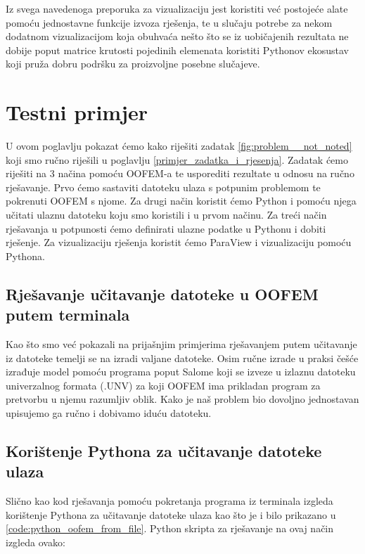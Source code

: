 \documentclass[a4paper,twoside,12pt]{memoir} %
\begin{document}
Iz svega navedenoga preporuka za vizualizaciju jest koristiti već postojeće alate pomoću jednostavne funkcije izvoza rješenja, te u slučaju potrebe za nekom dodatnom vizualizacijom koja obuhvaća nešto što se iz uobičajenih rezultata ne dobije poput matrice krutosti pojedinih elemenata koristiti Pythonov ekosustav koji pruža dobru podršku za proizvoljne posebne slučajeve.

\chapter{Testni primjer}
U ovom poglavlju pokazat ćemo kako riješiti zadatak \ref{fig:problem__not_noted} koji smo ručno riješili u poglavlju \ref{primjer_zadatka_i_rjesenja}. Zadatak ćemo riješiti na 3 načina pomoću OOFEM-a te usporediti rezultate u odnosu na ručno rješavanje. Prvo ćemo sastaviti datoteku ulaza s potpunim problemom te pokrenuti OOFEM s njome. Za drugi način koristit ćemo Python i pomoću njega učitati ulaznu datoteku koju smo koristili i u prvom načinu. Za treći način rješavanja u potpunosti ćemo definirati ulazne podatke u Pythonu i dobiti rješenje. Za vizualizaciju rješenja koristit ćemo ParaView i vizualizaciju pomoću Pythona.

\section{Rješavanje učitavanje datoteke u OOFEM putem terminala}
Kao što smo već pokazali na prijašnjim primjerima rješavanjem putem učitavanje iz datoteke temelji se na izradi valjane datoteke. Osim ručne izrade u praksi češće izrađuje model pomoću programa poput Salome koji se izveze u izlaznu datoteku univerzalnog formata (.UNV) za koji OOFEM ima prikladan program za pretvorbu u njemu razumljiv oblik. Kako je naš problem bio dovoljno jednostavan upisujemo ga ručno i dobivamo iduću datoteku.



\section{Korištenje Pythona za učitavanje datoteke ulaza}
Slično kao kod rješavanja pomoću pokretanja programa iz terminala izgleda korištenje Pythona za učitavanje datoteke ulaza kao što je i bilo prikazano u \ref{code:python_oofem_from_file}. Python skripta za rješavanje na ovaj način izgleda ovako: 
\end{document}
